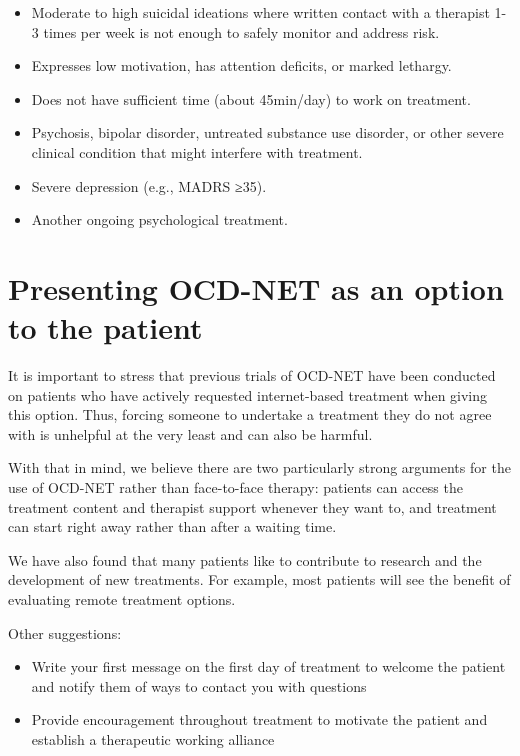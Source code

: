 \documentclass[]{book}
\providecommand{\tightlist}{%
  \setlength{\itemsep}{0pt}\setlength{\parskip}{0pt}}
\begin{document}
\begin{itemize}
\tightlist
\item
  Moderate to high suicidal ideations where written contact with a therapist 1-3 times per week is not enough to safely monitor and address risk.\\
\item
  Expresses low motivation, has attention deficits, or marked lethargy.\\
\item
  Does not have sufficient time (about 45min/day) to work on treatment.\\
\item
  Psychosis, bipolar disorder, untreated substance use disorder, or other severe clinical condition that might interfere with treatment.\\
\item
  Severe depression (e.g., MADRS ≥35).\\
\item
  Another ongoing psychological treatment.
\end{itemize}

\hypertarget{presenting-ocd-net-as-an-option-to-the-patient}{%
\section{Presenting OCD-NET as an option to the patient}\label{presenting-ocd-net-as-an-option-to-the-patient}}

It is important to stress that previous trials of OCD-NET have been conducted on patients who have actively requested internet-based treatment when giving this option. Thus, forcing someone to undertake a treatment they do not agree with is unhelpful at the very least and can also be harmful.

With that in mind, we believe there are two particularly strong arguments for the use of OCD-NET rather than face-to-face therapy: patients can access the treatment content and therapist support whenever they want to, and treatment can start right away rather than after a waiting time.

We have also found that many patients like to contribute to research and the development of new treatments. For example, most patients will see the benefit of evaluating remote treatment options.

Other suggestions:

\begin{itemize}
\tightlist
\item
  Write your first message on the first day of treatment to welcome the patient and notify them of ways to contact you with questions
\item
  Provide encouragement throughout treatment to motivate the patient and establish a therapeutic working alliance
\end{itemize}
\end{document}
